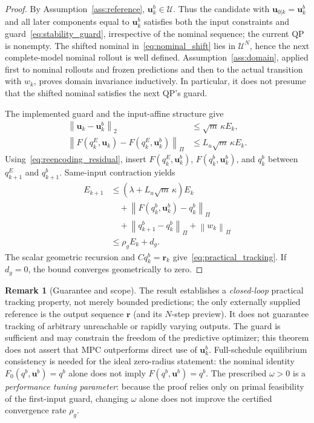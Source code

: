 \documentclass[journal]{IEEEtran}
\theoremstyle{plain}
\theoremstyle{definition}
\newtheorem{remark}{Remark}
\newcommand{\vr}{\mathbf{r}}
\newcommand{\vu}{\mathbf{u}}
\newcommand{\norm}[1]{\left\lVert #1\right\rVert}
\begin{document}
\begin{proof}
By Assumption~\ref{ass:reference}, $\vu_k^b\in\mathcal U$. Thus the candidate with $\vu_{0|k}=\vu_k^b$ and all later components equal to $\vu_k^b$ satisfies both the input constraints and guard~\eqref{eq:stability_guard}, irrespective of the nominal sequence; the current QP is nonempty. The shifted nominal in~\eqref{eq:nominal_shift} lies in $\mathcal U^N$, hence the next complete-model nominal rollout is well defined. Assumption~\ref{ass:domain}, applied first to nominal rollouts and frozen predictions and then to the actual transition with $w_k$, proves domain invariance inductively. In particular, it does not presume that the shifted nominal satisfies the next QP's guard.

The implemented guard and the input-affine structure give
\begin{align}
\norm{\vu_k-\vu_k^b}_2&\le\sqrt m\,\kappa E_k,\nonumber\\
\norm{F(q_k^E,\vu_k)-F(q_k^E,\vu_k^b)}_\Pi
&\le L_u\sqrt m\,\kappa E_k.
\end{align}
Using~\eqref{eq:reencoding_residual}, insert $F(q_k^E,\vu_k^b)$, $F(q_k^b,\vu_k^b)$, and $q_k^b$ between $q_{k+1}^E$ and $q_{k+1}^b$. Same-input contraction yields
\begin{equation}
\begin{split}
E_{k+1}&\le(\lambda+L_u\sqrt m\,\kappa)E_k\\
&\quad+\norm{F(q_k^b,\vu_k^b)-q_k^b}_\Pi\\
&\quad+\norm{q_{k+1}^b-q_k^b}_\Pi+\norm{w_k}_\Pi\\
&\le\rho_gE_k+d_g.
\end{split}
\label{eq:tracking_recursion}
\end{equation}
The scalar geometric recursion and $Cq_k^b=\vr_k$ give~\eqref{eq:practical_tracking}. If $d_g=0$, the bound converges geometrically to zero. 
\end{proof}

\begin{remark}[Guarantee and scope]
\label{rem:tracking_scope}
The result establishes a \emph{closed-loop} practical tracking property, not merely bounded predictions; the only externally supplied reference is the output sequence $\vr$ (and its $N$-step preview). It does not guarantee tracking of arbitrary unreachable or rapidly varying outputs. The guard is sufficient and may constrain the freedom of the predictive optimizer; this theorem does not assert that MPC outperforms direct use of $\vu_k^b$. Full-schedule equilibrium consistency is needed for the ideal zero-radius statement: the nominal identity $F_0(q^b,\vu^b)=q^b$ alone does not imply $F(q^b,\vu^b)=q^b$. The prescribed $\omega>0$ is a \emph{performance tuning parameter}: because the proof relies only on primal feasibility of the first-input guard, changing $\omega$ alone does not improve the certified convergence rate $\rho_g$.
\end{remark}
\end{document}
